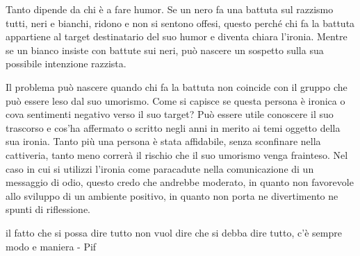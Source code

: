 \documentclass[12pt]{book} %
\begin{document}
\begin{mdframed}[linewidth=1pt]
\bigskip

Tanto dipende da chi è a fare humor. Se un nero fa una battuta sul razzismo tutti, neri e bianchi, ridono e non si
sentono offesi, questo perché chi fa la battuta appartiene al target destinatario del suo humor e diventa chiara
l'ironia. Mentre se un bianco insiste con battute sui neri, può nascere un sospetto sulla sua
possibile intenzione razzista.


\bigskip

Il problema può nascere quando chi fa la battuta non coincide con il gruppo che può essere leso dal suo umorismo. Come
si capisce se questa persona è ironica o cova sentimenti negativo verso il suo target? Può essere utile conoscere il
suo trascorso e cos'ha affermato o scritto negli anni in merito ai temi oggetto della sua ironia.
Tanto più una persona è stata affidabile, senza sconfinare nella cattiveria, tanto meno correrà il rischio che il suo
umorismo venga frainteso. Nel caso in cui si utilizzi l'ironia come paracadute nella comunicazione
di un messaggio di odio, questo credo che andrebbe moderato, in quanto non favorevole allo sviluppo di un ambiente
positivo, in quanto non porta ne divertimento ne spunti di
riflessione.

il fatto che si possa dire tutto non vuol dire che si debba dire tutto, c'è sempre modo e maniera -
Pif
\end{mdframed}
\end{document}
